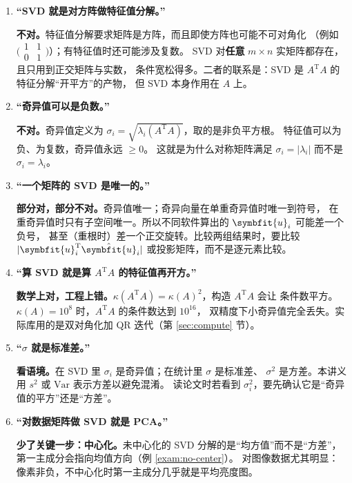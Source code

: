 \documentclass[UTF8, 11pt, a4paper, fontset=windows]{ctexart}
\theoremstyle{cnthm}
\theoremstyle{cndef}
\newcommand{\T}{^{\mathrm{T}}}
\newcommand{\abs}[1]{\lvert #1 \rvert}
\newcommand{\bu}{\symbfit{u}}
\begin{document}
\begin{enumerate}[leftmargin=2.2em, itemsep=0.9em]

  \item \textbf{“SVD 就是对方阵做特征值分解。”}

  \textbf{不对。}特征值分解要求矩阵是方阵，而且即使方阵也可能不可对角化
  （例如 $\bigl(\begin{smallmatrix}1&1\\0&1\end{smallmatrix}\bigr)$）；有特征值时还可能涉及复数。
  SVD 对\textbf{任意} $m\times n$ 实矩阵都存在，且只用到正交矩阵与实数，
  条件宽松得多。二者的联系是：SVD 是 $A\T A$ 的特征分解“开平方”的产物，
  但 SVD 本身作用在 $A$ 上。

  \item \textbf{“奇异值可以是负数。”}

  \textbf{不对。}奇异值定义为 $\sigma_i=\sqrt{\lambda_i(A\T A)}$，取的是非负平方根。
  特征值可以为负、为复数，奇异值永远 $\ge0$。
  这就是为什么对称矩阵满足 $\sigma_i=\abs{\lambda_i}$ 而不是 $\sigma_i=\lambda_i$。

  \item \textbf{“一个矩阵的 SVD 是唯一的。”}

  \textbf{部分对，部分不对。}奇异值唯一；奇异向量在单重奇异值时唯一到符号，
  在重奇异值时只有子空间唯一。所以不同软件算出的 $\bu_i$ 可能差一个负号，
  甚至（重根时）差一个正交旋转。比较两组结果时，要比较
  $\abs{\bu_i\T\hat{\bu}_i}$ 或投影矩阵，而不是逐元素比较。

  \item \textbf{“算 SVD 就是算 $A\T A$ 的特征值再开方。”}

  \textbf{数学上对，工程上错。}$\kappa(A\T A)=\kappa(A)^2$，构造 $A\T A$ 会让
  条件数平方。$\kappa(A)=10^{8}$ 时，$A\T A$ 的条件数达到 $10^{16}$，
  双精度下小奇异值完全丢失。实际库用的是双对角化加 QR 迭代（第 \ref{sec:compute} 节）。

  \item \textbf{“$\sigma$ 就是标准差。”}

  \textbf{看语境。}在 SVD 里 $\sigma_i$ 是奇异值；在统计里 $\sigma$ 是标准差、
  $\sigma^2$ 是方差。本讲义用 $s^2$ 或 $\mathrm{Var}$ 表示方差以避免混淆。
  读论文时若看到 $\sigma_i^2$，要先确认它是“奇异值的平方”还是“方差”。

  \item \textbf{“对数据矩阵做 SVD 就是 PCA。”}

  \textbf{少了关键一步：中心化。}未中心化的 SVD 分解的是“均方值”而不是“方差”，
  第一主成分会指向均值方向（例 \ref{exam:no-center}）。
  对图像数据尤其明显：像素非负，不中心化时第一主成分几乎就是平均亮度图。


\end{enumerate}
\end{document}
